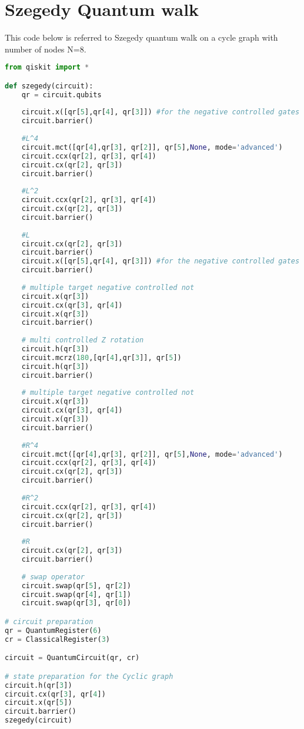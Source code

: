 \section{Szegedy Quantum walk}
This code below is referred to Szegedy quantum walk on a
cycle graph with number of nodes N=8.

\begin{lstlisting}[breaklines,language=Python,basicstyle=\tiny]
from qiskit import *

def szegedy(circuit):
    qr = circuit.qubits
    
    circuit.x([qr[5],qr[4], qr[3]]) #for the negative controlled gates
    circuit.barrier()
    
    #L^4
    circuit.mct([qr[4],qr[3], qr[2]], qr[5],None, mode='advanced')
    circuit.ccx(qr[2], qr[3], qr[4])
    circuit.cx(qr[2], qr[3])
    circuit.barrier()
    
    #L^2
    circuit.ccx(qr[2], qr[3], qr[4])
    circuit.cx(qr[2], qr[3])
    circuit.barrier()
    
    #L
    circuit.cx(qr[2], qr[3])
    circuit.barrier()
    circuit.x([qr[5],qr[4], qr[3]]) #for the negative controlled gates
    circuit.barrier()
    
    # multiple target negative controlled not
    circuit.x(qr[3])
    circuit.cx(qr[3], qr[4])
    circuit.x(qr[3])
    circuit.barrier()
    
    # multi controlled Z rotation
    circuit.h(qr[3])
    circuit.mcrz(180,[qr[4],qr[3]], qr[5])
    circuit.h(qr[3])
    circuit.barrier()
    
    # multiple target negative controlled not
    circuit.x(qr[3])
    circuit.cx(qr[3], qr[4])
    circuit.x(qr[3])
    circuit.barrier()
    
    #R^4
    circuit.mct([qr[4],qr[3], qr[2]], qr[5],None, mode='advanced')
    circuit.ccx(qr[2], qr[3], qr[4])
    circuit.cx(qr[2], qr[3])
    circuit.barrier()
    
    #R^2
    circuit.ccx(qr[2], qr[3], qr[4])
    circuit.cx(qr[2], qr[3])
    circuit.barrier()
    
    #R
    circuit.cx(qr[2], qr[3])
    circuit.barrier()
    
    # swap operator
    circuit.swap(qr[5], qr[2])
    circuit.swap(qr[4], qr[1])
    circuit.swap(qr[3], qr[0])

# circuit preparation
qr = QuantumRegister(6)
cr = ClassicalRegister(3)

circuit = QuantumCircuit(qr, cr)

# state preparation for the Cyclic graph
circuit.h(qr[3])
circuit.cx(qr[3], qr[4])
circuit.x(qr[5])
circuit.barrier()
szegedy(circuit)
\end{lstlisting}
